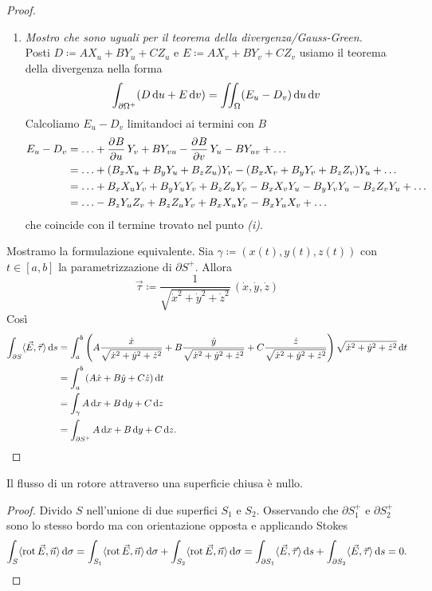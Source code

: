 \begin{proof}
\begin{enumerate}[label = \emph{(\roman*)}]
		\item \emph{Mostro che sono uguali per il teorema della divergenza/Gauss-Green.} \\
		Posti $ D \coloneqq A X_u + B Y_u + C Z_u $ e $ E \coloneqq A X_v + B Y_v + C Z_v $ usiamo il teorema della divergenza nella forma 
		\[
			\int_{\partial \Omega^+} (D \dif{u} + E \dif{v}) = \iint_{\Omega} (E_u - D_v) \dif{u} \dif{v}
		\] 
		Calcoliamo $ E_u - D_v $ limitandoci ai termini con $ B $
		\begin{align*}
			E_u - D_v & = \ldots + \dpd{B}{u} Y_v + B Y_{vu} - \dpd{B}{v} Y_u - B Y_{uv} + \ldots \\
			& = \ldots + (B_x X_u + B_y Y_u + B_z Z_u) Y_v - (B_x X_v + B_y Y_v + B_z Z_v) Y_u + \ldots \\
			& = \ldots + B_x X_u Y_v + B_y Y_u Y_v + B_z Z_u Y_v - B_x X_v Y_u - B_y Y_v Y_u - B_z Z_v Y_u + \ldots \\
			& = \ldots - B_zY_uZ_v + B_zZ_uY_v + B_xX_uY_v - B_xY_uX_v  + \ldots
		\end{align*}
		che coincide con il termine trovato nel punto \emph{(i)}. \\		
	\end{enumerate}
	Mostramo la formulazione equivalente. Sia $ \gamma \coloneqq (x(t), y(t), z(t)) $ con $ t \in [a, b] $ la parametrizzazione di $ \partial S^+ $. Allora 
	\[
		\vec{\tau} \coloneqq \frac{1}{\sqrt{\dot{x}^2 + \dot{y}^2 + \dot{z}^2}} \, (\dot{x}, \dot{y}, \dot{z})
	\]
	Così
	\begin{align*}
		\int_{\partial S} \langle {\vec{E}, \vec{\tau}} \rangle \dif{s} & = \int_{a}^{b} \left(A \frac{\dot{x}}{\sqrt{\dot{x}^2 + \dot{y}^2 + \dot{z}^2}} + B \frac{\dot{y}}{\sqrt{\dot{x}^2 + \dot{y}^2 + \dot{z}^2}} + C \frac{\dot{z}}{\sqrt{\dot{x}^2 + \dot{y}^2 + \dot{z}^2}}\right) \sqrt{\dot{x}^2 + \dot{y}^2 + \dot{z}^2} \dif{t}  \\
		& = \int_{a}^{b} \left(A \dot{x} + B \dot{y} + C \dot{z}\right) \dif{t} \\
		& = \int_{\gamma} A \dif{x} + B \dif{y} + C \dif{z} \\
		& = \int_{\partial S^+} A \dif{x} + B \dif{y} + C \dif{z}. \qedhere
	\end{align*}
\end{proof}

\begin{corollary}
	Il flusso di un rotore attraverso una superficie chiusa è nullo.
\end{corollary}
%
\begin{proof}
	Divido $ S $ nell'unione di due superfici $ S_1 $ e $ S_2 $. Osservando che $ \partial S_1^+ $ e $ \partial S_2^+ $ sono lo stesso bordo ma con orientazione opposta e applicando Stokes
	\[
		\int_{S} \langle {\rot{\vec{E}}, \vec{n}} \rangle \dif{\sigma} = \int_{S_1} \langle {\rot{\vec{E}}, \vec{n}} \rangle \dif{\sigma} + \int_{S_2} \langle {\rot{\vec{E}}, \vec{n}} \rangle \dif{\sigma} = \int_{\partial S_1} \langle {\vec{E}, \vec{\tau}} \rangle \dif{s} + \int_{\partial S_2} \langle {\vec{E}, \vec{\tau}} \rangle \dif{s} = 0. \qedhere
	\]
\end{proof}